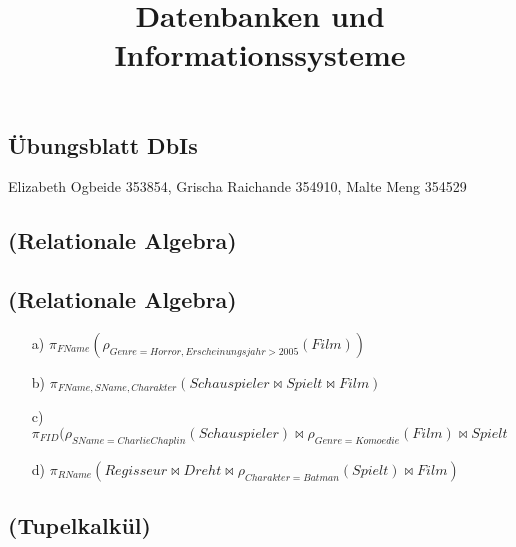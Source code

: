 \documentclass[11pt,a4paper]{article}
\title{Datenbanken und Informationssysteme}
\begin{document}
\begin{center}
\setcounter{section}{2}
\section{\"Ubungsblatt DbIs}
\end{center}
\begin{center}
\item{Elizabeth Ogbeide 353854, Grischa Raichande 354910, Malte Meng 354529}
\end{center}
\subsection{(Relationale Algebra)}

\subsection{(Relationale Algebra)}
\begin{enumerate}
\item[a)] $\pi_{FName}(\rho_{Genre = Horror, Erscheinungsjahr > 2005}(Film))$
\item[b)] $\pi_{FName, SName, Charakter}(Schauspieler \Join Spielt \Join Film)$
\item[c)] $\pi_{FID}(\rho_{SName = Charlie Chaplin}(Schauspieler) \Join \rho_{Genre = Komoedie}(Film) \Join Spielt$
\item[d)] $\pi_{RName}(Regisseur \Join Dreht \Join \rho_{Charakter = Batman}(Spielt) \Join Film)$
\end{enumerate}
\subsection{(Tupelkalk\"ul)}
\end{document}
